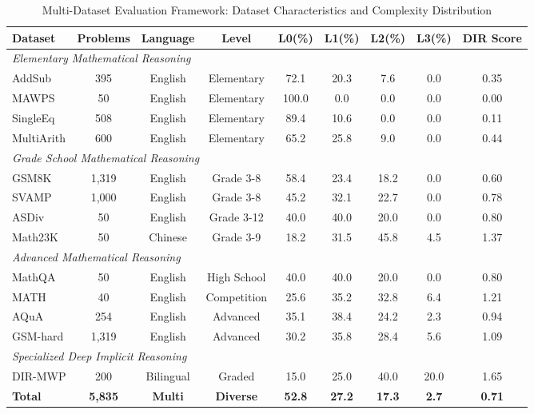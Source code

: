 \begin{table*}[htbp]
\caption{Multi-Dataset Evaluation Framework: Dataset Characteristics and Complexity Distribution}
\label{tab:dataset_framework}
\centering
\small
\begin{tabular}{lcccccccc}
\toprule
\textbf{Dataset} & \textbf{Problems} & \textbf{Language} & \textbf{Level} & \textbf{L0(\%)} & \textbf{L1(\%)} & \textbf{L2(\%)} & \textbf{L3(\%)} & \textbf{DIR Score} \\
\midrule
\multicolumn{9}{l}{\textit{Elementary Mathematical Reasoning}} \\
AddSub & 395 & English & Elementary & 72.1 & 20.3 & 7.6 & 0.0 & 0.35 \\
MAWPS & 50 & English & Elementary & 100.0 & 0.0 & 0.0 & 0.0 & 0.00 \\
SingleEq & 508 & English & Elementary & 89.4 & 10.6 & 0.0 & 0.0 & 0.11 \\
MultiArith & 600 & English & Elementary & 65.2 & 25.8 & 9.0 & 0.0 & 0.44 \\
\midrule
\multicolumn{9}{l}{\textit{Grade School Mathematical Reasoning}} \\
GSM8K & 1,319 & English & Grade 3-8 & 58.4 & 23.4 & 18.2 & 0.0 & 0.60 \\
SVAMP & 1,000 & English & Grade 3-8 & 45.2 & 32.1 & 22.7 & 0.0 & 0.78 \\
ASDiv & 50 & English & Grade 3-12 & 40.0 & 40.0 & 20.0 & 0.0 & 0.80 \\
Math23K & 50 & Chinese & Grade 3-9 & 18.2 & 31.5 & 45.8 & 4.5 & 1.37 \\
\midrule
\multicolumn{9}{l}{\textit{Advanced Mathematical Reasoning}} \\
MathQA & 50 & English & High School & 40.0 & 40.0 & 20.0 & 0.0 & 0.80 \\
MATH & 40 & English & Competition & 25.6 & 35.2 & 32.8 & 6.4 & 1.21 \\
AQuA & 254 & English & Advanced & 35.1 & 38.4 & 24.2 & 2.3 & 0.94 \\
GSM-hard & 1,319 & English & Advanced & 30.2 & 35.8 & 28.4 & 5.6 & 1.09 \\
\midrule
\multicolumn{9}{l}{\textit{Specialized Deep Implicit Reasoning}} \\
DIR-MWP & 200 & Bilingual & Graded & 15.0 & 25.0 & 40.0 & 20.0 & 1.65 \\
\midrule
\textbf{Total} & \textbf{5,835} & \textbf{Multi} & \textbf{Diverse} & \textbf{52.8} & \textbf{27.2} & \textbf{17.3} & \textbf{2.7} & \textbf{0.71} \\
\bottomrule
\end{tabular}
\end{table*}

